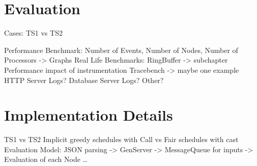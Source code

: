 \section{Evaluation}

Cases: TS1 vs TS2

Performance Benchmark: Number of Events, Number of Nodes, Number of Processors -> Graphs
Real Life Benchmarks: RingBuffer -> subchapter Performance impact of instrumentation
                      Tracebench -> maybe one example
                      HTTP Server Logs?
                      Database Server Logs?
                      Other?

\section{Implementation Details}

TS1 vs TS2
Implicit greedy schedules with Call vs Fair schedules with cast
Evaluation Model: JSON parsing -> GenServer -> MessageQueue for inputs -> Evaluation of each Node \dots
